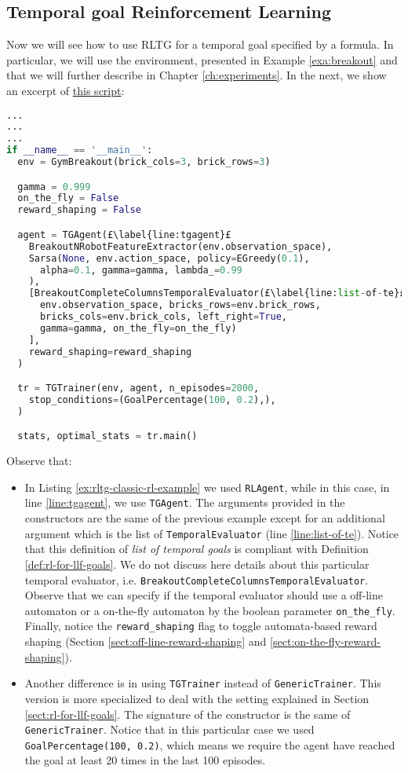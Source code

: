 \subsection{Temporal goal Reinforcement Learning}
Now we will see how to use RLTG for a temporal goal specified by a \LLf formula. In particular, we will use the \Breakout environment, presented in Example \ref{exa:breakout} and that we will further describe in Chapter \ref{ch:experiments}. In the next, we show an excerpt of \href{https://github.com/MarcoFavorito/rltg/blob/master/examples/pygames/breakout.py}{this script}:

\begin{lstlisting}[style = Python, language = Python, escapechar = £, label={ex:rltg-temporal-goal-rl-example}, caption={Temporal Goal Reinforcement Learning using RLTG}]
...
...
...
if __name__ == '__main__':
  env = GymBreakout(brick_cols=3, brick_rows=3)

  gamma = 0.999
  on_the_fly = False
  reward_shaping = False

  agent = TGAgent(£\label{line:tgagent}£
    BreakoutNRobotFeatureExtractor(env.observation_space),
    Sarsa(None, env.action_space, policy=EGreedy(0.1),
      alpha=0.1, gamma=gamma, lambda_=0.99
    ),
    [BreakoutCompleteColumnsTemporalEvaluator(£\label{line:list-of-te}£
      env.observation_space, bricks_rows=env.brick_rows, 
      bricks_cols=env.brick_cols, left_right=True, 
      gamma=gamma, on_the_fly=on_the_fly)
    ],
    reward_shaping=reward_shaping
  )

  tr = TGTrainer(env, agent, n_episodes=2000,
    stop_conditions=(GoalPercentage(100, 0.2),),
  )

  stats, optimal_stats = tr.main()
\end{lstlisting}
Observe that:
\begin{itemize}
	\item In Listing \ref{ex:rltg-classic-rl-example} we used \texttt{RLAgent}, while in this case, in line \ref{line:tgagent}, we use \texttt{TGAgent}. The arguments provided in the constructors are the same of the previous example except for an additional argument which is the list of \texttt{TemporalEvaluator} (line \ref{line:list-of-te}). Notice that this definition of \emph{list of temporal goals} is compliant with Definition \ref{def:rl-for-llf-goals}. We do not discuss here details about this particular temporal evaluator, i.e. \texttt{BreakoutCompleteColumnsTemporalEvaluator}. Observe that we can specify if the temporal evaluator should use a off-line automaton or a on-the-fly automaton by the boolean parameter \texttt{on\_the\_fly}. Finally, notice the \texttt{reward\_shaping} flag to toggle automata-based reward shaping (Section \ref{sect:off-line-reward-shaping} and \ref{sect:on-the-fly-reward-shaping}).
	\item Another difference is in using \texttt{TGTrainer} instead of \texttt{GenericTrainer}. This version is more specialized to deal with the setting explained in Section \ref{sect:rl-for-llf-goals}. The signature of the constructor is the same of \texttt{GenericTrainer}. Notice that in this particular case we used \texttt{GoalPercentage(100, 0.2)}, which means we require the agent have reached the goal at least 20 times in the last 100 episodes.
\end{itemize}

